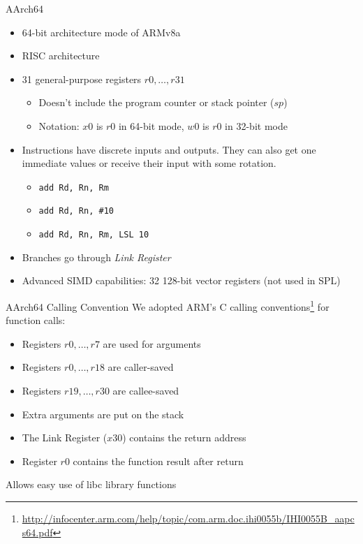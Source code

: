 \documentclass[department=icis, slidenumbers=slide, official=true]{beamerruhuisstijl}
\begin{document}
\begin{frame}{AArch64}
    \begin{itemize}
        \item 64-bit architecture mode of ARMv8a
        \item RISC architecture
        \item 31 general-purpose registers $r0, \ldots, r31$
            \begin{itemize}
                \item Doesn't include the program counter or stack pointer ($sp$)
                \item Notation: $x0$ is $r0$ in 64-bit mode, $w0$ is $r0$ in 32-bit mode
            \end{itemize}
        \item Instructions have discrete inputs and outputs. They can also get one immediate values or receive their input with some rotation.
            \begin{itemize}
                \item \texttt{add Rd, Rn, Rm}
                \item \texttt{add Rd, Rn, \#10}
                \item \texttt{add Rd, Rn, Rm, LSL 10}
            \end{itemize}
        \item Branches go through \emph{Link Register}
        \item Advanced SIMD capabilities: 32 128-bit vector registers (not used in SPL)
    \end{itemize}
\end{frame}

\begin{frame}{AArch64 Calling Convention}
    We adopted ARM's C calling conventions\footnote{\url{http://infocenter.arm.com/help/topic/com.arm.doc.ihi0055b/IHI0055B_aapcs64.pdf}} for function calls:
    \begin{itemize}
        \item Registers $r0, \ldots, r7$ are used for arguments
        \item Registers $r0, \ldots, r18$ are caller-saved
        \item Registers $r19, \ldots, r30$ are callee-saved
        \item Extra arguments are put on the stack
        \item The Link Register ($x30$) contains the return address
        \item Register $r0$ contains the function result after return
    \end{itemize}

    \vspace{3em}
    Allows easy use of libc library functions
\end{frame}
\end{document}
